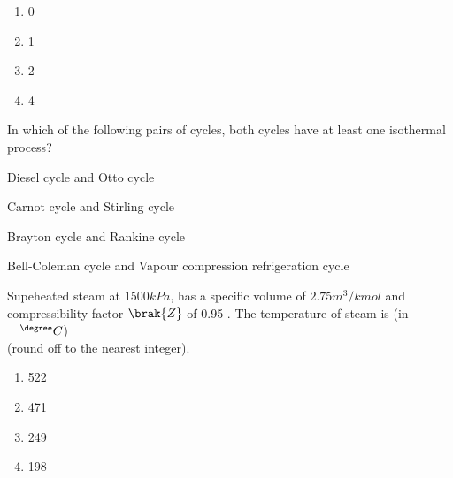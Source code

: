             \hfill{}
            \begin{multicols}{4}
                \begin{enumerate}
                    \item 0
                        \columnbreak
                    \item 1
                        \columnbreak
                \item 2
                    \columnbreak
                \item 4
            \end{enumerate}
        \end{multicols}

    \item In which of the following pairs of cycles, both cycles have at least one isothermal
        process?
        \hfill{}
            \begin{enumerate}
        \begin{multicols}{2}
                \item  Diesel cycle and Otto cycle
                    \columnbreak
                \item Carnot cycle and Stirling cycle
        \end{multicols}
        \begin{multicols}{2}
                \item Brayton cycle and Rankine cycle
                    \columnbreak
                \item Bell-Coleman cycle and Vapour compression refrigeration cycle
        \end{multicols}
            \end{enumerate}

    \item Supeheated steam at 1500$kPa$, has a specific volume of $2.75 m^3/kmol$ and compressibility
        factor $\brak{Z}$ of 0.95 . The temperature of steam is (in $\quad^{\degree}C$)\\
        (round off to the nearest integer).
        \hfill{}
        \begin{multicols}{4}
            \begin{enumerate}
                \item 522
                    \columnbreak
                \item 471
                    \columnbreak
                \item 249
                    \columnbreak
                \item 198
            \end{enumerate}
        \end{multicols}

